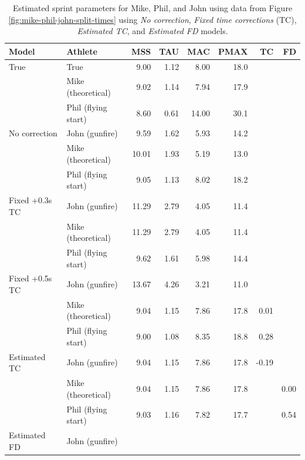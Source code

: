 \documentclass[fleqn,10pt]{wlpeerj} %
\begin{document}
\begin{table}

\caption{\label{tab:all-estimates}Estimated sprint parameters for Mike, Phil, and John using data from Figure \ref{fig:mike-phil-john-split-times} using \emph{No correction}, \emph{Fixed time corrections} (TC), \emph{Estimated TC}, and \emph{Estimated FD} models.}
\centering
\begin{tabular}[t]{llrrrrrr}
\toprule
Model & Athlete & MSS & TAU & MAC & PMAX & TC & FD\\
\midrule
True & True & 9.00 & 1.12 & 8.00 & 18.0 &  & \\
\cmidrule{1-8}
 & Mike (theoretical) & 9.02 & 1.14 & 7.94 & 17.9 &  & \\

 & Phil (flying start) & 8.60 & 0.61 & 14.00 & 30.1 &  & \\

\multirow{-3}{*}{\raggedright\arraybackslash No correction} & John (gunfire) & 9.59 & 1.62 & 5.93 & 14.2 &  & \\
\cmidrule{1-8}
 & Mike (theoretical) & 10.01 & 1.93 & 5.19 & 13.0 &  & \\

 & Phil (flying start) & 9.05 & 1.13 & 8.02 & 18.2 &  & \\

\multirow{-3}{*}{\raggedright\arraybackslash Fixed +0.3s TC} & John (gunfire) & 11.29 & 2.79 & 4.05 & 11.4 &  & \\
\cmidrule{1-8}
 & Mike (theoretical) & 11.29 & 2.79 & 4.05 & 11.4 &  & \\

 & Phil (flying start) & 9.62 & 1.61 & 5.98 & 14.4 &  & \\

\multirow{-3}{*}{\raggedright\arraybackslash Fixed +0.5s TC} & John (gunfire) & 13.67 & 4.26 & 3.21 & 11.0 &  & \\
\cmidrule{1-8}
 & Mike (theoretical) & 9.04 & 1.15 & 7.86 & 17.8 & 0.01 & \\

 & Phil (flying start) & 9.00 & 1.08 & 8.35 & 18.8 & 0.28 & \\

\multirow{-3}{*}{\raggedright\arraybackslash Estimated TC} & John (gunfire) & 9.04 & 1.15 & 7.86 & 17.8 & -0.19 & \\
\cmidrule{1-8}
 & Mike (theoretical) & 9.04 & 1.15 & 7.86 & 17.8 &  & 0.00\\

 & Phil (flying start) & 9.03 & 1.16 & 7.82 & 17.7 &  & 0.54\\

\multirow{-3}{*}{\raggedright\arraybackslash Estimated FD} & John (gunfire) &  &  &  &  &  & \\
\bottomrule
\end{tabular}
\end{table}
\end{document}
